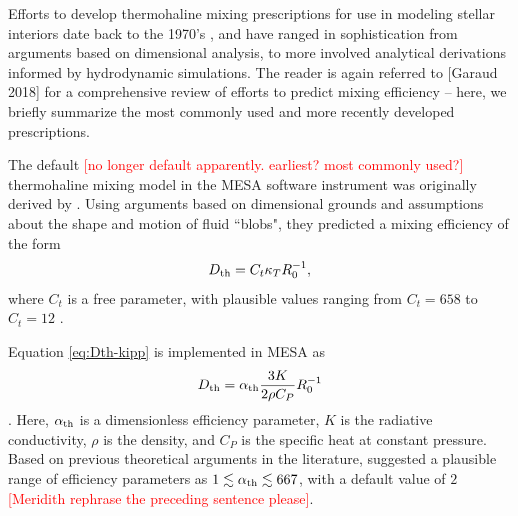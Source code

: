 Efforts to develop thermohaline mixing prescriptions for use in modeling stellar interiors date back to the 1970's \citep{ulrich_1972}, and have ranged in sophistication from arguments based on dimensional analysis, to more involved analytical derivations informed by hydrodynamic simulations. 
The reader is again referred to [Garaud 2018] for a comprehensive review of efforts to predict mixing efficiency -- here, we briefly summarize the most commonly used and more recently developed prescriptions.



The default \textcolor{red}{[no longer default apparently. earliest? most commonly used?]} thermohaline mixing model in the MESA software instrument \citep{mesa2} was originally derived by \citet{ulrich_1972, kippenhahn_etal_1980}.
Using arguments based on dimensional grounds and assumptions about the shape and motion of fluid ``blobs", they predicted a mixing efficiency of the form
\begin{equation} \label{eq:Dth-kipp}
    \Dth = C_t \kappa_T R_0^{-1},
\end{equation}
\citep[see Eq.~(5) of][]{charbonnel_thermohaline_2007}
where $C_t$ is a free parameter, with plausible values ranging from $C_t = 658$ \citep{ulrich_1972} to $C_t = 12$ \citep{kippenhahn_etal_1980}.

Equation \eqref{eq:Dth-kipp} is implemented in MESA as
\begin{equation} \label{eq:Dth-kipp-MESA}
    \Dth = \alpha_{\rm{th}} \frac{3 K}{2\rho C_P}R_0^{-1}
\end{equation}
\citep[see Eq.~(14) of][]{mesa2}. 
Here, $\alpha_{\rm{th}}$ is a dimensionless efficiency parameter, $K$ is the radiative conductivity, $\rho$ is the density, and $C_P$ is the specific heat at constant pressure. 
Based on previous theoretical arguments in the literature, \citet{mesa2} suggested a plausible range of efficiency parameters as $1 \lesssim \alpha_{\rm{th}} \lesssim 667$, with a default value of $2$ \textcolor{red}{[Meridith rephrase the preceding sentence please]}. 

